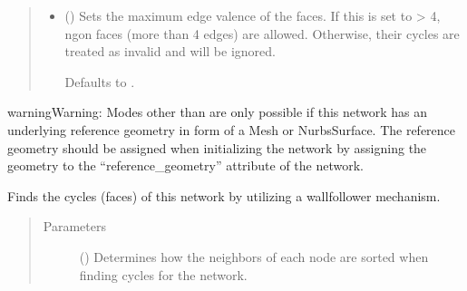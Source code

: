 \documentclass[letterpaper,10pt,english]{sphinxmanual}
\begin{document}
\begin{fulllineitems}
\begin{fulllineitems}
\begin{quote}
\begin{description}
\begin{itemize}
\item {} 
 (\sphinxstyleliteralemphasis{\sphinxupquote{, }}) \textendash{} 
Sets the maximum edge valence of the faces. If this is set to \textgreater{} 4,
n\sphinxhyphen{}gon faces (more than 4 edges) are allowed. Otherwise, their cycles
are treated as invalid and will be ignored.

Defaults to .


\end{itemize}

\end{description}\end{quote}

\begin{sphinxadmonition}{warning}{Warning:}
Modes other than  are only possible if this network has an
underlying reference geometry in form of a Mesh or NurbsSurface. The
reference geometry should be assigned when initializing the network by
assigning the geometry to the “reference\_geometry” attribute of the
network.
\end{sphinxadmonition}

\end{fulllineitems}


\begin{fulllineitems}
\label{\detokenize{cockatoo:cockatoo.KnitDiNetwork.find_cycles}}
Finds the cycles (faces) of this network by utilizing a wall\sphinxhyphen{}follower
mechanism.
\begin{quote}\begin{description}
\item[{Parameters}] \leavevmode
{} (\sphinxstyleliteralemphasis{\sphinxupquote{, }}) \textendash{} 
Determines how the neighbors of each node are sorted when finding
cycles for the network.


\end{description}
\end{quote}
\end{fulllineitems}
\end{fulllineitems}
\end{document}
